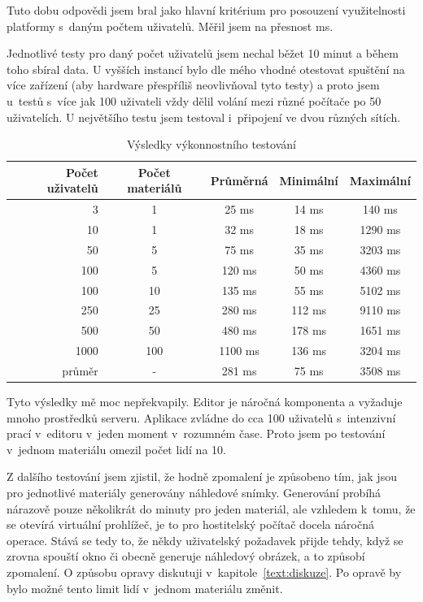 Tuto dobu odpovědi jsem bral jako hlavní kritérium pro posouzení využitelnosti platformy s~daným počtem uživatelů.
Měřil jsem na přesnost ms.

Jednotlivé testy pro daný počet uživatelů jsem nechal běžet 10 minut a během toho sbíral data.
U vyšších instancí bylo dle mého vhodné otestovat spuštění na více zařízení (aby hardware přespříliš neovlivňoval tyto testy) a proto jsem u~testů s~více jak 100 uživateli vždy dělil volání mezi různé počítače po 50 uživatelích.
U největšího testu jsem testoval i~připojení ve dvou různých sítích.

\begin{table}[ht!]
    \centering
    \begin{tabular}{r|c|c|c|c}
        Počet uživatelů & Počet materiálů & Průměrná & Minimální & Maximální\\\hline\hline
        3 & 1 & 25 ms & 14 ms & 140 ms \\\hline
        10 & 1 & 32 ms & 18 ms & 1290 ms \\\hline
        50 & 5 & 75 ms & 35 ms & 3203 ms \\\hline
        100 & 5 & 120 ms & 50 ms & 4360 ms \\\hline
        100 & 10 & 135 ms & 55 ms & 5102 ms \\\hline
        250 & 25 & 280 ms & 112 ms & 9110 ms \\\hline
        500 & 50 & 480 ms & 178 ms & 1651 ms \\\hline
        1000 & 100 & 1100 ms & 136 ms & 3204 ms \\\hline\hline
        průměr & - & 281 ms & 75 ms & 3508 ms
    \end{tabular}
    \caption{Výsledky výkonnostního testování}\label{tab:vysledkyTestovani}
\end{table}

Tyto výsledky mě moc nepřekvapily.
Editor je náročná komponenta a vyžaduje mnoho prostředků serveru.
Aplikace zvládne do cca 100 uživatelů s~intenzivní prací v~editoru v~jeden moment v~rozumném čase.
Proto jsem po testování v~jednom materiálu omezil počet lidí na 10.

Z dalšího testování jsem zjistil, že hodně zpomalení je způsobeno tím, jak jsou pro jednotlivé materiály generovány náhledové snímky.
Generování probíhá nárazově pouze několikrát do minuty pro jeden materiál, ale vzhledem k~tomu, že se otevírá virtuální prohlížeč, je to pro hostitelský počítač docela náročná operace.
Stává se tedy to, že někdy uživatelský požadavek přijde tehdy, když se zrovna spouští okno či obecně generuje náhledový obrázek, a to způsobí zpomalení.
O způsobu opravy diskutuji v~kapitole~\ref{text:diskuze}.
Po opravě by bylo možné tento limit lidí v~jednom materiálu změnit.

